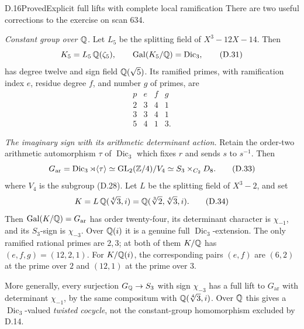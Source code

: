 \begin{statement}{D.16}{Proved}{Explicit full lifts with complete local ramification}
There are two useful corrections to the exercise on scan 634.

\emph{Constant group over \(\mathbb Q\).}
Let \(L_5\) be the splitting field of \(X^3-12X-14\).
Then
\[
 K_5=L_5\,\mathbb Q(\zeta_5),\qquad
 \operatorname{Gal}(K_5/\mathbb Q)=\operatorname{Dic}_3 ,
 \tag{D.31}
\]
has degree twelve and sign field \(\mathbb Q(\sqrt5)\).
Its ramified primes, with ramification index \(e\), residue
degree \(f\), and number \(g\) of primes, are
\[
 \begin{array}{c|rrr}
 p&e&f&g\\ \hline
 2&3&4&1\\
 3&3&4&1\\
 5&4&1&3 .
 \end{array}                                                 \tag{D.32}
\]

\emph{The imaginary sign with its arithmetic determinant action.}
Retain the order-two arithmetic automorphism \(\tau\) of
\(\operatorname{Dic}_3\) which fixes \(r\) and sends
\(s\) to \(s^{-1}\).  Then
\[
 G_{\mathrm{ar}}=\operatorname{Dic}_3\rtimes\langle\tau\rangle
 \simeq\operatorname{GL}_2(\mathbb Z/4)/V_4
 \simeq S_3\times_{C_2}D_8 .
 \tag{D.33}
\]
where \(V_4\) is the subgroup (D.28).
Let \(L\) be the splitting field of \(X^3-2\), and set
\[
 K=L\,\mathbb Q(\sqrt[4]{3},i)
    =\mathbb Q(\sqrt[3]{2},\sqrt[4]{3},i).
 \tag{D.34}
\]
Then \(\operatorname{Gal}(K/\mathbb Q)=G_{\mathrm{ar}}\) has order
twenty-four, its determinant character is \(\chi_{-1}\),
and its \(S_3\)-sign is \(\chi_{-3}\).
Over \(\mathbb Q(i)\) it is a genuine full
\(\operatorname{Dic}_3\)-extension.
The only ramified rational primes are \(2,3\); at both of
them \(K/\mathbb Q\) has \((e,f,g)=(12,2,1)\).
For \(K/\mathbb Q(i)\), the corresponding pairs \((e,f)\) are
\((6,2)\) at the prime over \(2\) and \((12,1)\) at the
prime over \(3\).

More generally, every surjection \(G_\mathbb Q\to S_3\) with sign
\(\chi_{-3}\) has a full lift to \(G_{\mathrm{ar}}\) with
determinant \(\chi_{-1}\), by the same compositum with
\(\mathbb Q(\sqrt[4]{3},i)\).  Over \(\mathbb Q\) this gives a
\(\operatorname{Dic}_3\)-valued \emph{twisted cocycle},
not the constant-group homomorphism excluded by D.14.
\end{statement}
